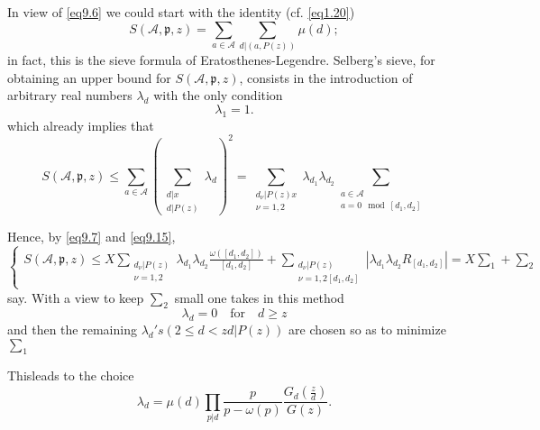 In view of \eqref{eq9.6} we could start with the identity (cf. \eqref{eq1.20})
\begin{equation*}
S (\mathscr{A}, \mathfrak{p}, z) = \sum_{a \in \mathscr{A}} \sum_{d|(a,
  P(z))} \mu(d);\tag{9.23}\label{eq9.23} 
\end{equation*}
in fact, this is the sieve formula of Eratosthenes-Legendre. Selberg's
sieve, for obtaining an upper bound for $S(\mathscr{A},
\mathfrak{p},z)$, consists in the introduction of 
arbitrary real numbers $\lambda_d$ with the only condition  
\begin{equation*}
\lambda_1 = 1.\tag{9.24}\label{eq9.24}
\end{equation*}
which already implies that 
\begin{equation*}
S (\mathscr{A}, \mathfrak{p}, z)\leq  \sum_{a \in
  \mathscr{A}}(\sum_{\substack{d | x \\ {d|P(z)}}} \lambda_d)^2 =
\sum_{\substack{d_{\nu} |P(z) x \\ {\nu = 1,2}}} \lambda_{d_1}
\lambda_{d_{2}} \sum_{\substack{a \in \mathscr{A} \\ {a= 0 \mod
      [d_1,d_2]}}}\tag{9.25}\label{eq9.25} 
\end{equation*}  

Hence, by \eqref{eq9.7} and \eqref{eq9.15},
{\fontsize{10pt}{12pt}\selectfont
\begin{equation*}
\begin{cases}
S (\mathscr{A}, \mathfrak{p}, z)\leq X
\sum\limits_{\substack{d_{\nu}| P(z) \\ {\nu  = 1,2 }}}
\lambda_{d_{1}}\lambda_{d_{2}}
\frac{\omega([d_1,d_2])}{[d_1,d_2]}+\sum\limits_{\substack{d_{\nu}|
    P(z) \\ {\nu  = 1,2 [d_1,d_2]}}}|\lambda_{d_{1}}\lambda_{d_{2}}
R_{[d_1,d_2]}|= 
 X  \sum\limits_1 + \sum \limits_2 
\end{cases}\tag{9.26}\label{eq9.26}
\end{equation*}}\relax
say. With a view to keep $\sum_2$ small one takes in this method 
\begin{equation*}
\lambda_d = 0\quad \text{for}\quad d \geq z \tag{9.27}\label{eq9.27}
\end{equation*}
and then the remaining $\lambda_d's(2 \leq d < z d|P(z))$ are chosen
so as to minimize $\sum_1$ 

This\pageoriginale leads to the choice 
\begin{equation*}
\lambda_d = \mu(d) \prod_{p|d} \frac{p}{p- \omega(p)} \frac{G_d
  (\frac{z}{d})}{G(z)}.\tag{9.28}\label{eq9.28} 
\end{equation*}


